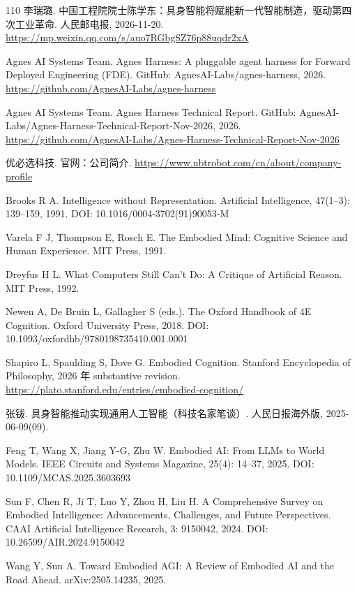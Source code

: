 \documentclass[10pt,fontset=fandol]{ctexart}
\begin{document}
\begin{thebibliography}{110}
李瑞璐. 中国工程院院士陈学东：具身智能将赋能新一代智能制造，驱动第四次工业革命. 人民邮电报, 2026-11-20. \url{https://mp.weixin.qq.com/s/auo7RGbgSZ76p88uqdr2xA}

Agnes AI Systems Team. Agnes Harness: A pluggable agent harness for Forward Deployed Engineering (FDE). GitHub: AgnesAI-Labs/agnes-harness, 2026. \url{https://github.com/AgnesAI-Labs/agnes-harness}

Agnes AI Systems Team. Agnes Harness Technical Report. GitHub: AgnesAI-Labs/Agnes-Harness-Technical-Report-Nov-2026, 2026. \url{https://github.com/AgnesAI-Labs/Agnes-Harness-Technical-Report-Nov-2026}

优必选科技. 官网：公司简介. \url{https://www.ubtrobot.com/cn/about/company-profile}

Brooks R A. Intelligence without Representation. Artificial Intelligence, 47(1–3): 139–159, 1991. DOI: 10.1016/0004-3702(91)90053-M

Varela F J, Thompson E, Rosch E. The Embodied Mind: Cognitive Science and Human Experience. MIT Press, 1991.

Dreyfus H L. What Computers Still Can't Do: A Critique of Artificial Reason. MIT Press, 1992.

Newen A, De Bruin L, Gallagher S (eds.). The Oxford Handbook of 4E Cognition. Oxford University Press, 2018. DOI: 10.1093/oxfordhb/9780198735410.001.0001

Shapiro L, Spaulding S, Dove G. Embodied Cognition. Stanford Encyclopedia of Philosophy, 2026 年 substantive revision. \url{https://plato.stanford.edu/entries/embodied-cognition/}

张钹. 具身智能推动实现通用人工智能（科技名家笔谈）. 人民日报海外版, 2025-06-09(09).

Feng T, Wang X, Jiang Y-G, Zhu W. Embodied AI: From LLMs to World Models. IEEE Circuits and Systems Magazine, 25(4): 14–37, 2025. DOI: 10.1109/MCAS.2025.3603693

Sun F, Chen R, Ji T, Luo Y, Zhou H, Liu H. A Comprehensive Survey on Embodied Intelligence: Advancements, Challenges, and Future Perspectives. CAAI Artificial Intelligence Research, 3: 9150042, 2024. DOI: 10.26599/AIR.2024.9150042

Wang Y, Sun A. Toward Embodied AGI: A Review of Embodied AI and the Road Ahead. arXiv:2505.14235, 2025.


\end{thebibliography}
\end{document}
